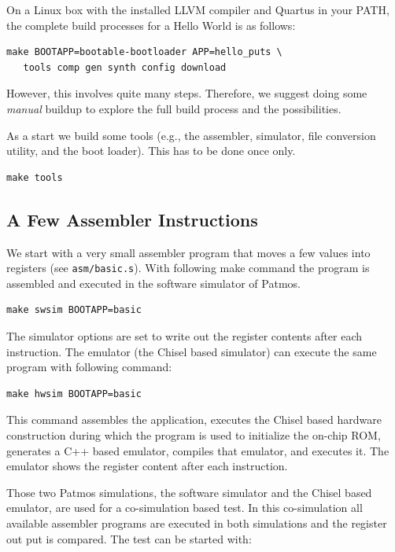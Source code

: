 \documentclass[a4paper,fontsize=10pt,twoside,DIV15,BCOR12mm,headinclude=true,footinclude=false,pagesize,bibtotoc]{scrbook}
\newcommand{\code}[1]{{\texttt{#1}}}
\begin{document}
On a Linux box with the installed LLVM compiler and Quartus in your PATH,
the complete build processes for a Hello World is as follows:

\begin{verbatim}
make BOOTAPP=bootable-bootloader APP=hello_puts \
   tools comp gen synth config download
\end{verbatim}

However, this involves quite many steps. Therefore, we suggest doing some \emph{manual}
buildup to explore the full build process and the possibilities.

As a start we build some tools (e.g., the assembler, simulator, file conversion
utility, and the boot loader). This has to be done once only.

\begin{verbatim}
make tools
\end{verbatim}

\subsection{A Few Assembler Instructions}

We start with a very small assembler program that moves a few values into registers
(see \code{asm/basic.s}). With following make command the program is assembled
and executed in the software simulator of Patmos.

\begin{verbatim}
make swsim BOOTAPP=basic
\end{verbatim}

The simulator options are set to write out the register contents after each instruction.
The emulator (the Chisel based simulator) can execute the same program
with following command:

\begin{verbatim}
make hwsim BOOTAPP=basic
\end{verbatim}

This command assembles the application, executes the Chisel based hardware
construction during which the program is used to initialize the on-chip ROM,
generates a C++ based emulator, compiles that emulator, and executes it.
The emulator shows the register content after each instruction.

Those two Patmos simulations, the software simulator and the Chisel based emulator,
are used for a co-simulation based test. In this co-simulation all available assembler
programs are executed in both simulations and the register out put is compared.
The test can be started with:
\end{document}
